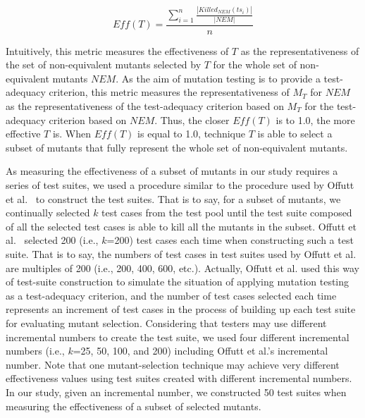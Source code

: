 \begin{equation}\label{form:Measurement}
    Eff(T)=\frac{\sum_{i=1}^n {\frac{|Killed_{NEM}(ts_i)|}{|NEM|}}}{n}
\end{equation}
\vspace{-2ex}

Intuitively, this metric measures the effectiveness of $T$ as the
representativeness of the set of non-equivalent mutants selected
by $T$ for the whole set of non-equivalent mutants $NEM$. As the
aim of mutation testing is to provide a test-adequacy criterion,
this metric measures the representativeness of $M_T$ for $NEM$ as
the representativeness of the test-adequacy criterion based on
$M_T$ for the test-adequacy criterion based on $NEM$. Thus, the
closer $Eff(T)$ is to 1.0, the more effective $T$ is. When
$Eff(T)$ is equal to 1.0, technique $T$ is able to select a subset
of mutants that fully represent the whole set of non-equivalent
mutants.

As measuring the effectiveness of a subset of mutants in our study
requires a series of test suites, we used a procedure similar to
the procedure used by Offutt et al.~\cite{Offutt:96} to construct
the test suites. That is to say, for a subset of mutants, we
continually selected $k$ test cases from the test pool until the
test suite composed of all the selected test cases is able to kill
all the mutants in the subset. Offutt et al.~\cite{Offutt:96}
selected 200 (i.e., $k$=200) test cases each time when
constructing such a test suite. That is to say, the numbers of
test cases in test suites used by Offutt et al. are multiples of
200 (i.e., 200, 400, 600, etc.). Actually, Offutt et al. used this
way of test-suite construction to simulate the situation of
applying mutation testing as a test-adequacy criterion, and the
number of test cases selected each time represents an increment of
test cases in the process of building up each test suite for
evaluating mutant selection. Considering that testers may use
different incremental numbers to create the test suite, we used
four different incremental numbers (i.e., $k$=25, 50, 100, and
200) including Offutt et al.'s incremental number. Note that one
mutant-selection technique may achieve very different
effectiveness values using test suites created with different
incremental numbers. In our study, given an incremental number, we
constructed 50 test suites when measuring the effectiveness of a
subset of selected mutants.

